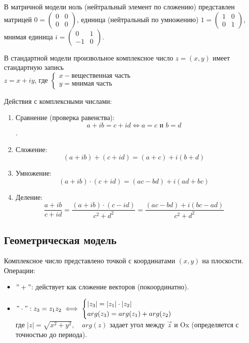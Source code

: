 В матричной модели ноль (нейтральный элемент по сложению) представлен матрицей
$0 =\begin{pmatrix}
    0 & 0 \\
    0 & 0
\end{pmatrix}$, единица (нейтральный по умножению)
$1 = \begin{pmatrix}
    1 & 0 \\
    0 & 1
\end{pmatrix}$, мнимая единица  
$i = \begin{pmatrix}
    0 & 1 \\
    -1 & 0
\end{pmatrix}$.

В стандартной модели произвольное комплексное число $z = (x, y)$ 
имеет стандартную запись \\$z = x + iy$, где $\begin{cases}
    x - \text{вещественная часть}\\
    y = \text{мнимая часть}
\end{cases}$

Действия с комплексными числами:
\begin{enumerate}
    \item Сравнение (проверка равенства):
        \[a + ib = c + id \iff a = c \text{ и } b = d\].
    \item Сложение:
        \[(a+ib) + (c+id) = (a+c) + i(b+d)\]
    \item Умножение:
        \[(a+ib)\cdot(c+id) = (ac - bd) + i (ad + bc)\]
    \item Деление:
        \[\frac{a+ib}{c+id} = \frac{(a+ib)\cdot(c-id)}{c^2+d^2} = \frac{(ac - bd) + i(bc - ad)}{c^2 + d^2}\]
\end{enumerate}


\subsection{Геометрическая модель}

Комплексное число представлено точкой с координатами $(x, y)$ на плоскости.\\
Операции:
\begin{itemize}
    \item $"+"$: действует как сложение векторов (покоординатно).
    \item $"\cdot": z_3 = z_1z_2 \iff \begin{cases}
        |z_3| = |z_1|\cdot|z_2| \\
        arg(z_3) = arg(z_1) + arg(z_2)
    \end{cases}$
    \\ где $|z| = \sqrt{x^2 + y^2}, \quad arg(z)$ задает угол между $\vec{z}$ и Ox 
    (определяется с точностью до периода).
\end{itemize}

